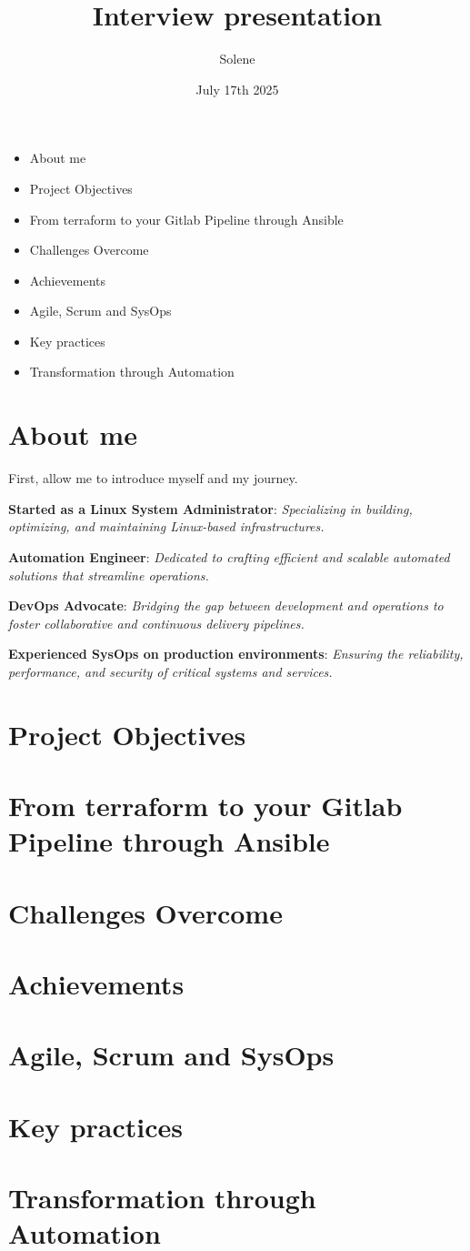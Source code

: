 \documentclass{article}
\title{Interview presentation}
\author{Solene}
\date{July 17th 2025}
\begin{document}
\begin{itemize}
    \item About me 
    \item Project Objectives 
    \item From terraform to your Gitlab Pipeline through Ansible
    \item Challenges Overcome
    \item Achievements
    \item Agile, Scrum and SysOps
    \item Key practices
    \item Transformation through Automation
\end{itemize}

\section{About me}
First, allow me to introduce myself and my journey.

\textbf{Started as a Linux System Administrator}:  \textit{Specializing in building, optimizing, and maintaining Linux-based infrastructures.}

\textbf{Automation Engineer}: \textit{Dedicated to crafting efficient and scalable automated solutions that streamline operations.}

\textbf{DevOps Advocate}: \textit{Bridging the gap between development and operations to foster collaborative and continuous delivery pipelines.}

\textbf{Experienced SysOps on production environments}:  \textit{Ensuring the reliability, performance, and security of critical systems and services.}

\section{Project Objectives}
\section{From terraform to your Gitlab Pipeline through Ansible}
\section{Challenges Overcome}
\section{Achievements}
\section{Agile, Scrum and SysOps}
\section{Key practices}
\section{Transformation through Automation}
\end{document}
